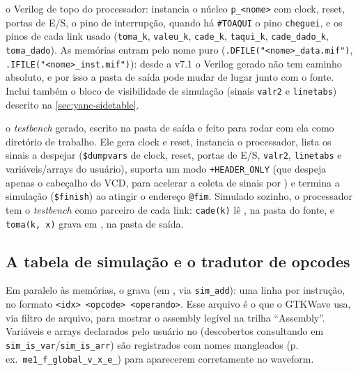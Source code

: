 \begin{description}[leftmargin=1.2em]
  \item[\file{<nome>.v}] o Verilog de topo do processador: instancia o núcleo
    \lstinline|p_<nome>| com clock, reset, portas de E/S, o pino de interrupção,
    quando há \lstinline|#TOAQUI| o pino \lstinline|cheguei|, e os pinos de cada
    link usado (\lstinline|toma_k|, \lstinline|valeu_k|, \lstinline|cade_k|,
    \lstinline|taqui_k|, \lstinline|cade_dado_k|, \lstinline|toma_dado|). As
    memórias entram pelo nome puro (\lstinline|.DFILE("<nome>_data.mif")|,
    \lstinline|.IFILE("<nome>_inst.mif")|): desde a v7.1 o Verilog gerado não tem
    caminho absoluto, e por isso a pasta de saída pode mudar de lugar junto com o
    fonte. Inclui também o
    bloco de visibilidade de simulação (sinais \lstinline|valr2| e
    \lstinline|linetabs|) descrito na \autoref{sec:yanc-sidetable}.
  \item[\file{<nome>\_tb.v}] o \emph{testbench} gerado, escrito na pasta de
    saída e feito para rodar com ela como diretório de trabalho. Ele gera clock e reset, instancia o processador, lista os sinais
    a despejar (\lstinline|$dumpvars| de clock, reset, portas de E/S,
    \lstinline|valr2|, \lstinline|linetabs| e variáveis/arrays do usuário),
    suporta um modo \lstinline|+HEADER_ONLY| (que despeja apenas o cabeçalho do
    VCD, para acelerar a coleta de sinais por ) e termina a
    simulação (\lstinline|$finish|) ao atingir o endereço \lstinline|@fim|. Simulado
    sozinho, o processador tem o \emph{testbench} como parceiro de cada link:
    \lstinline|cade(k)| lê , na pasta do fonte, e
    \lstinline|toma(k, x)| grava em , na pasta de saída.
\end{description}

\subsection{A tabela de simulação e o tradutor de opcodes}
\label{sec:yanc-asmcomp-sim}

Em paralelo às memórias, o  grava  (em
, via \lstinline|sim_add|): uma linha por instrução, no formato
\lstinline|<idx> <opcode> <operando>|. Esse arquivo é o que o GTKWave usa, via
filtro de arquivo, para mostrar o assembly legível na trilha \enquote{Assembly}.
Variáveis e arrays declarados pelo usuário no  (descobertos consultando
 em \lstinline|sim_is_var|/\lstinline|sim_is_arr|) são
registrados com nomes mangleados (p.\,ex.\ \lstinline|me1_f_global_v_x_e_|) para
aparecerem corretamente no waveform.

